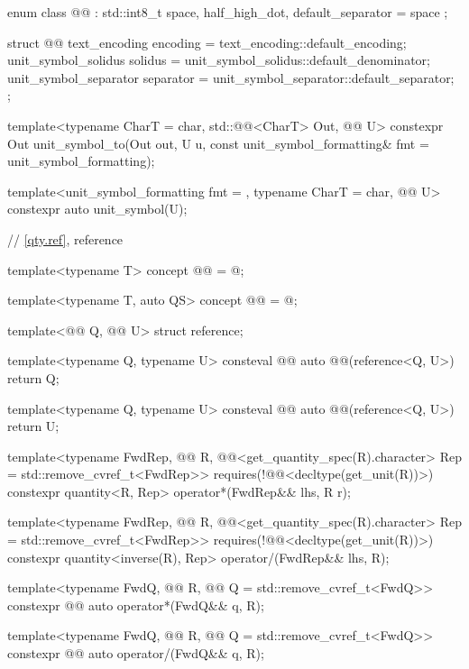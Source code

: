 \begin{codeblock}
enum class @@ : std::int8_t {
  space,
  half_high_dot,
  default_separator = space
};

struct @@ {
  text_encoding encoding = text_encoding::default_encoding;
  unit_symbol_solidus solidus = unit_symbol_solidus::default_denominator;
  unit_symbol_separator separator = unit_symbol_separator::default_separator;
};

template<typename CharT = char, std::@@<CharT> Out, @@ U>
constexpr Out unit_symbol_to(Out out, U u,
                             const unit_symbol_formatting& fmt = unit_symbol_formatting{});

template<unit_symbol_formatting fmt = {}, typename CharT = char, @@ U>
constexpr auto unit_symbol(U);

// \ref{qty.ref}, reference

template<typename T>
concept @@ = @\seebelownc@;

template<typename T, auto QS>
concept @@ = @\seebelownc@;

template<@@ Q, @@ U>
struct reference;

template<typename Q, typename U>
consteval @@ auto @@(reference<Q, U>)
{
  return Q{};
}

template<typename Q, typename U>
consteval @@ auto @@(reference<Q, U>)
{
  return U{};
}

template<typename FwdRep, @@ R,
         @@<get_quantity_spec(R{}).character> Rep = std::remove_cvref_t<FwdRep>>
  requires(!@@<decltype(get_unit(R{}))>)
constexpr quantity<R{}, Rep> operator*(FwdRep&& lhs, R r);

template<typename FwdRep, @@ R,
         @@<get_quantity_spec(R{}).character> Rep = std::remove_cvref_t<FwdRep>>
  requires(!@@<decltype(get_unit(R{}))>)
constexpr quantity<inverse(R{}), Rep> operator/(FwdRep&& lhs, R);

template<typename FwdQ, @@ R, @@ Q = std::remove_cvref_t<FwdQ>>
constexpr @@ auto operator*(FwdQ&& q, R);

template<typename FwdQ, @@ R, @@ Q = std::remove_cvref_t<FwdQ>>
constexpr @@ auto operator/(FwdQ&& q, R);


\end{codeblock}
